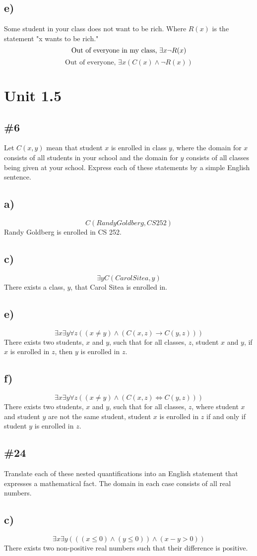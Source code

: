 \documentclass{article}
\newcommand{\unit}[1]{\section{Unit #1}}
\newcommand{\problem}[1]{\subsection{\##1}}
\renewcommand{\And}{\wedge}
\begin{document}
\subsection{e)}
Some student in your class does not want to be rich. Where \(R(x)\) is the statement "x wants to be rich."
\[
    \text{Out of everyone in my class, } \exists x \neg R(x) \\
\]
\[
    \text{Out of everyone, } \exists x(C(x) \And \neg R(x))
\]
\pagebreak
\unit{1.5}
\problem{6}
Let \(C(x, y)\) mean that student \(x\) is enrolled in class \(y\), where the domain for \(x\) consists of all students in your school and the domain for \(y\) consists of all classes being given at your school. Express each of these statements by a simple English sentence.


\subsection{a)}
\[C(Randy Goldberg, CS 252)\]
Randy Goldberg is enrolled in CS 252.
\subsection{c)}
\[\exists yC(Carol Sitea, y)\]
There exists a class, \(y\), that Carol Sitea is enrolled in.
\subsection{e)}
\[\exists x \exists y \forall z((x \neq y) \And (C(x, z) \rightarrow C(y, z)))\]
There exists two students, \(x\) and \(y\), such that for all classes, \(z\), student \(x\) and \(y\), if \(x\) is enrolled in \(z\), then \(y\) is enrolled in \(z\).
\subsection{f)}
\[\exists x\exists y\forall z((x \neq y) \And (C(x, z) \iff C(y, z)))\]
There exists two students, \(x\) and \(y\), such that for all classes, \(z\), where student \(x\) and student \(y\) are not the same student, student \(x\) is enrolled in \(z\) if and only if student \(y\) is enrolled in \(z\).
\pagebreak
\problem{24}
Translate each of these nested quantifications into an English statement that expresses a mathematical fact. The domain in each case consists of all real numbers.
\subsection{c)}
\[\exists x\exists y(((x \leq 0) \And (y \leq 0)) \And (x - y > 0))\]
There exists two non-positive real numbers such that their difference is positive.
\end{document}
